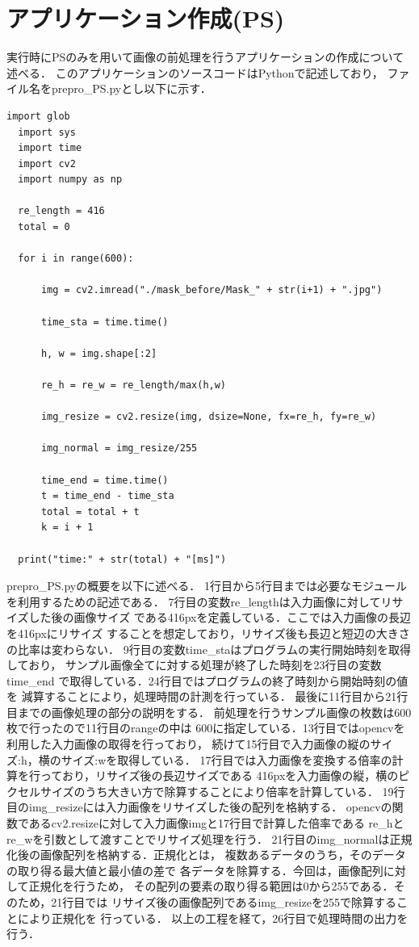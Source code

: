 \documentclass[11pt,a4j]{jreport}
\begin{document}
\section{アプリケーション作成(PS)}
実行時にPSのみを用いて画像の前処理を行うアプリケーションの作成について述べる．
このアプリケーションのソースコードはPythonで記述しており，
ファイル名をprepro_PS.pyとし以下に示す．
\begin{lstlisting}[caption=prepro_PS.py]
  import glob
  import sys
  import time
  import cv2
  import numpy as np
  
  re_length = 416
  total = 0
  
  for i in range(600):
  
      img = cv2.imread("./mask_before/Mask_" + str(i+1) + ".jpg")
  
      time_sta = time.time()
  
      h, w = img.shape[:2]
  
      re_h = re_w = re_length/max(h,w)
  
      img_resize = cv2.resize(img, dsize=None, fx=re_h, fy=re_w)
  
      img_normal = img_resize/255
  
      time_end = time.time()
      t = time_end - time_sta
      total = total + t
      k = i + 1
  
  print("time:" + str(total) + "[ms]")
\end{lstlisting}
prepro_PS.pyの概要を以下に述べる．
1行目から5行目までは必要なモジュールを利用するための記述である．
7行目の変数re_lengthは入力画像に対してリサイズした後の画像サイズ
である416pxを定義している．ここでは入力画像の長辺を416pxにリサイズ
することを想定しており，リサイズ後も長辺と短辺の大きさの比率は変わらない．
9行目の変数time_staはプログラムの実行開始時刻を取得しており，
サンプル画像全てに対する処理が終了した時刻を23行目の変数time_end
で取得している．24行目ではプログラムの終了時刻から開始時刻の値を
減算することにより，処理時間の計測を行っている．
最後に11行目から21行目までの画像処理の部分の説明をする．
前処理を行うサンプル画像の枚数は600枚で行ったので11行目のrangeの中は
600に指定している．13行目ではopencvを利用した入力画像の取得を行っており，
続けて15行目で入力画像の縦のサイズ:h，横のサイズ:wを取得している．
17行目では入力画像を変換する倍率の計算を行っており，リサイズ後の長辺サイズである
416pxを入力画像の縦，横のピクセルサイズのうち大きい方で除算することにより倍率を計算している．
19行目のimg_resizeには入力画像をリサイズした後の配列を格納する．
opencvの関数であるcv2.resizeに対して入力画像imgと17行目で計算した倍率である
re_hとre_wを引数として渡すことでリサイズ処理を行う．
21行目のimg_normalは正規化後の画像配列を格納する．正規化とは，
複数あるデータのうち，そのデータの取り得る最大値と最小値の差で
各データを除算する．今回は，画像配列に対して正規化を行うため，
その配列の要素の取り得る範囲は0から255である．そのため，21行目では
リサイズ後の画像配列であるimg_resizeを255で除算することにより正規化を
行っている．
以上の工程を経て，26行目で処理時間の出力を行う．
\end{document}
